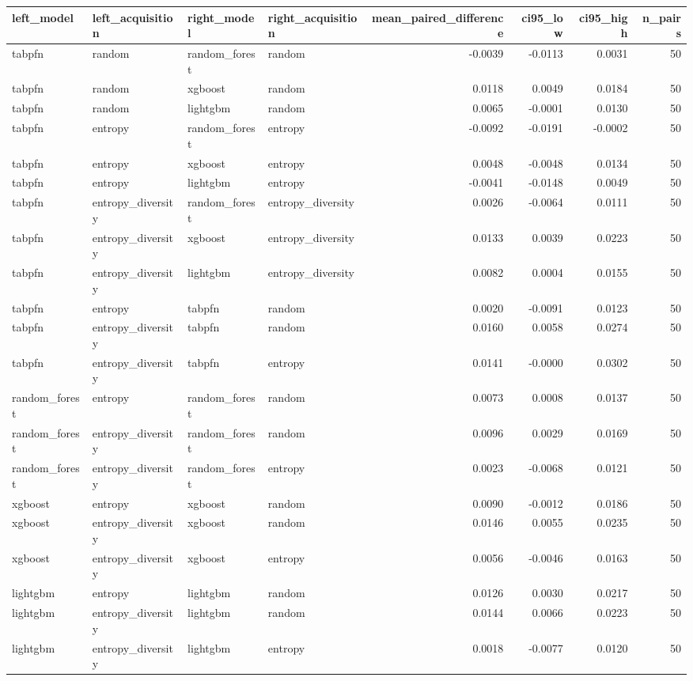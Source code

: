 \begin{tabular}{llllrrrr}
\toprule
left_model & left_acquisition & right_model & right_acquisition & mean_paired_difference & ci95_low & ci95_high & n_pairs \\
\midrule
tabpfn & random & random_forest & random & -0.0039 & -0.0113 & 0.0031 & 50 \\
tabpfn & random & xgboost & random & 0.0118 & 0.0049 & 0.0184 & 50 \\
tabpfn & random & lightgbm & random & 0.0065 & -0.0001 & 0.0130 & 50 \\
tabpfn & entropy & random_forest & entropy & -0.0092 & -0.0191 & -0.0002 & 50 \\
tabpfn & entropy & xgboost & entropy & 0.0048 & -0.0048 & 0.0134 & 50 \\
tabpfn & entropy & lightgbm & entropy & -0.0041 & -0.0148 & 0.0049 & 50 \\
tabpfn & entropy_diversity & random_forest & entropy_diversity & 0.0026 & -0.0064 & 0.0111 & 50 \\
tabpfn & entropy_diversity & xgboost & entropy_diversity & 0.0133 & 0.0039 & 0.0223 & 50 \\
tabpfn & entropy_diversity & lightgbm & entropy_diversity & 0.0082 & 0.0004 & 0.0155 & 50 \\
tabpfn & entropy & tabpfn & random & 0.0020 & -0.0091 & 0.0123 & 50 \\
tabpfn & entropy_diversity & tabpfn & random & 0.0160 & 0.0058 & 0.0274 & 50 \\
tabpfn & entropy_diversity & tabpfn & entropy & 0.0141 & -0.0000 & 0.0302 & 50 \\
random_forest & entropy & random_forest & random & 0.0073 & 0.0008 & 0.0137 & 50 \\
random_forest & entropy_diversity & random_forest & random & 0.0096 & 0.0029 & 0.0169 & 50 \\
random_forest & entropy_diversity & random_forest & entropy & 0.0023 & -0.0068 & 0.0121 & 50 \\
xgboost & entropy & xgboost & random & 0.0090 & -0.0012 & 0.0186 & 50 \\
xgboost & entropy_diversity & xgboost & random & 0.0146 & 0.0055 & 0.0235 & 50 \\
xgboost & entropy_diversity & xgboost & entropy & 0.0056 & -0.0046 & 0.0163 & 50 \\
lightgbm & entropy & lightgbm & random & 0.0126 & 0.0030 & 0.0217 & 50 \\
lightgbm & entropy_diversity & lightgbm & random & 0.0144 & 0.0066 & 0.0223 & 50 \\
lightgbm & entropy_diversity & lightgbm & entropy & 0.0018 & -0.0077 & 0.0120 & 50 \\
\bottomrule
\end{tabular}
